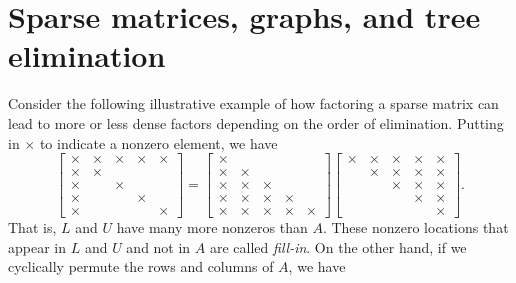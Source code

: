 \section{Sparse matrices, graphs, and tree elimination}

Consider the following illustrative example of how factoring a sparse
matrix can lead to more or less dense factors depending on the order
of elimination.  Putting in $\times$ to indicate a nonzero element, we
have
\[
  \begin{bmatrix}
    \times & \times & \times & \times & \times \\
    \times & \times &        &        &        \\
    \times &        & \times &        &        \\
    \times &        &        & \times &        \\
    \times &        &        &        & \times
  \end{bmatrix} =
  \begin{bmatrix}
    \times &        &        &        &        \\
    \times & \times &        &        &        \\
    \times & \times & \times &        &        \\
    \times & \times & \times & \times &        \\
    \times & \times & \times & \times & \times
  \end{bmatrix}
  \begin{bmatrix}
    \times & \times & \times & \times & \times \\
           & \times & \times & \times & \times \\
           &        & \times & \times & \times \\
           &        &        & \times & \times \\
           &        &        &        & \times
  \end{bmatrix}.
\]
That is, $L$ and $U$ have many more nonzeros than $A$.
These nonzero locations that appear in $L$ and $U$ and not in $A$
are called {\em fill-in}.  On the other hand, if we cyclically
permute the rows and columns of $A$, we have

